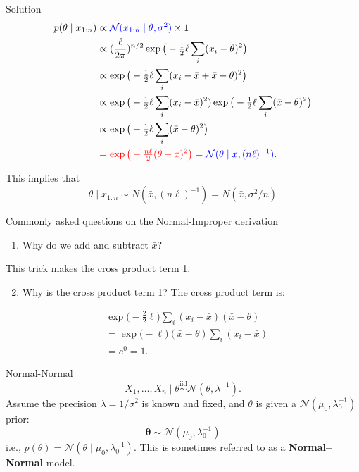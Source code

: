 \documentclass[
  ignorenonframetext,
]{beamer}
\providecommand{\tightlist}{%
  \setlength{\itemsep}{0pt}\setlength{\parskip}{0pt}}
\newcommand{\btheta}{{\bm\theta}}
\newcommand{\N}{\mathcal{N}}
\newcommand{\iid}{\stackrel{\mathrm{iid}}{\sim}}
\begin{document}
\begin{frame}{Solution}
\protect\hypertarget{solution}{}
\begin{align}
p(\theta \mid x_{1:n}) 
&\propto
\textcolor{blue}{\N(x_{1:n} \mid \theta,\sigma^2)} \times 1 \\
& \propto (\frac{\ell}{2\pi})^{n/2}\exp\big(-\tfrac{1}{2}\ell \sum_i(x_i-\theta)^2\big)\notag\\
& \propto \exp\big(-\tfrac{1}{2}\ell \sum_i(x_i -\bar{x} + \bar{x} - \theta)^2\big)\notag\\
& \propto \exp\big(-\tfrac{1}{2}\ell \sum_i(x_i -\bar{x})^2)
\exp\big(-\tfrac{1}{2}\ell \sum_i( \bar{x} - \theta)^2\big)\notag\\
&\propto 
\exp\big(-\tfrac{1}{2}\ell \sum_i( \bar{x} - \theta)^2\big) \\
&= \textcolor{red}{\exp\big(-\tfrac{n \ell}{2} (\theta - \bar{x} )^2\big)}
= \textcolor{blue}{\N(\theta \mid \bar{x}, (n\ell)^{-1}).}
\end{align}

This implies that
\[\theta \mid x_{1:n} \sim N(\bar{x}, (n\ell)^{-1}) = N(\bar{x}, \sigma^2/n)\]
\end{frame}

\begin{frame}{Commonly asked questions on the Normal-Improper
derivation}
\protect\hypertarget{commonly-asked-questions-on-the-normal-improper-derivation}{}
\begin{enumerate}
\tightlist
\item
  Why do we add and subtract \(\bar{x}\)?
\end{enumerate}

This trick makes the cross product term 1.

\begin{enumerate}
\setcounter{enumi}{1}
\tightlist
\item
  Why is the cross product term 1? The cross product term is:
\end{enumerate}

\begin{align*}
&\exp\big(-\tfrac{2}{2}\ell)\sum_i(x_i -\bar{x})(\bar{x} - \theta)\\
&=\exp\big(-\ell)(\bar{x} - \theta)\sum_i(x_i -\bar{x})\\
&=e^{0}=1.
\end{align*}
\end{frame}

\begin{frame}{Normal-Normal}
\protect\hypertarget{normal-normal}{}
\[ X_1,\dotsc,X_n \mid \theta \iid\N(\theta,\lambda^{-1}). \] Assume the
precision \(\lambda = 1/\sigma^2\) is known and fixed, and \(\theta\) is
given a \(\N(\mu_0,\lambda_0^{-1})\) prior:
\[\btheta \sim \N(\mu_0,\lambda_0^{-1})\] i.e.,
\(p(\theta) = \N(\theta\mid \mu_0,\lambda_0^{-1})\). This is sometimes
referred to as a \textbf{Normal--Normal} model.
\end{frame}
\end{document}
